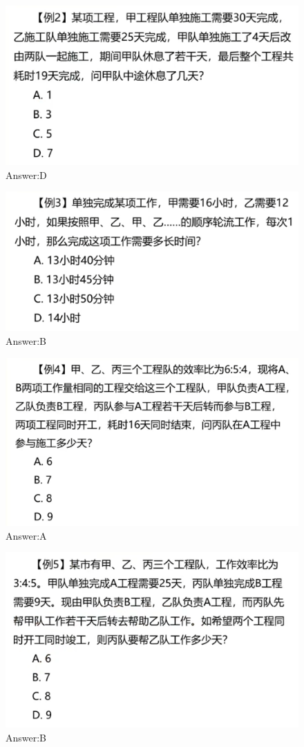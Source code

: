 \documentclass{article}
\numberwithin{equation}{section}						%
\numberwithin{figure}{section}							%
\begin{document}
\begin{sloppypar}
\begin{figure}[H]
     \centering
     \includegraphics[width=0.6\linewidth]{270.png}
		\caption{Answer:D}
\end{figure}

\begin{figure}[H]
     \centering
     \includegraphics[width=0.6\linewidth]{271.png}
		\caption{Answer:B}
\end{figure}


\begin{figure}[H]
     \centering
     \includegraphics[width=0.6\linewidth]{272.png}
		\caption{Answer:A}
\end{figure}

\begin{figure}[H]
     \centering
     \includegraphics[width=0.6\linewidth]{273.png}
		\caption{Answer:B}
\end{figure}


\end{sloppypar}
\end{document}
